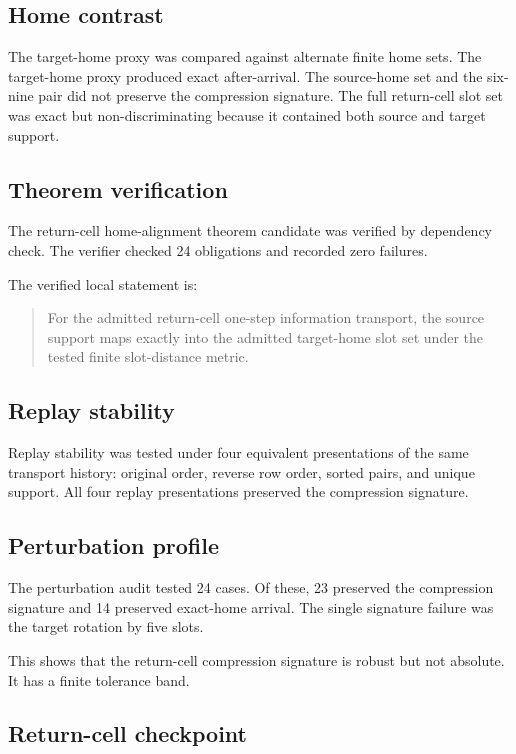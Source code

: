 \subsection{Home contrast}

The target-home proxy was compared against alternate finite home sets. The
target-home proxy produced exact after-arrival. The source-home set and the
six-nine pair did not preserve the compression signature. The full return-cell
slot set was exact but non-discriminating because it contained both source and
target support.

\subsection{Theorem verification}

The return-cell home-alignment theorem candidate was verified by dependency
check. The verifier checked 24 obligations and recorded zero failures.

The verified local statement is:

\begin{quote}
For the admitted return-cell one-step information transport, the source
support maps exactly into the admitted target-home slot set under the tested
finite slot-distance metric.
\end{quote}

\subsection{Replay stability}

Replay stability was tested under four equivalent presentations of the same
transport history: original order, reverse row order, sorted pairs, and unique
support. All four replay presentations preserved the compression signature.

\subsection{Perturbation profile}

The perturbation audit tested 24 cases. Of these, 23 preserved the compression
signature and 14 preserved exact-home arrival. The single signature failure
was the target rotation by five slots.

This shows that the return-cell compression signature is robust but not
absolute. It has a finite tolerance band.

\subsection{Return-cell checkpoint}

